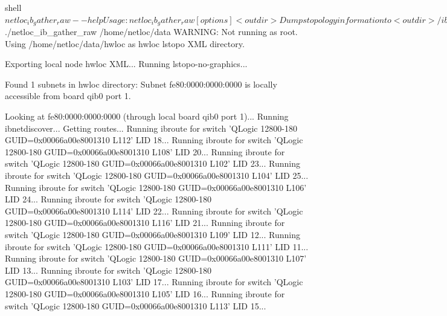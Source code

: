 \begin{DoxyVerb}shell$ netloc_ib_gather_raw --help
Usage: netloc_ib_gather_raw [options] <outdir>
  Dumps topology information to <outdir>/ib-raw/
  Subnets are guessed from the <outdir>/hwloc/ directory where
  the hwloc XML exports of some nodes are stored.
Options:
 --sudo
    Pass sudo to internal ibnetdiscover and ibroute invocations.
    Useful when the entire script cannot run as root.
 --hwloc-dir <dir>
    Use <dir> instead of <outdir>/hwloc/ for hwloc XML exports.
 --force-subnet [<subnet>:]<board>:<port> to force the discovery
    Do not guess subnets from hwloc XML exports.
    Force discovery on local board <board> port <port>
    and optionally force the subnet id <subnet>
    instead of reading it from the first GID.
    Examples: --force-subnet mlx4_0:1
              --force-subnet fe80:0000:0000:0000:mlx4_0:1
 --ibnetdiscover /path/to/ibnetdiscover
 --ibroute /path/to/ibroute
    Specify exact location of programs. Default is /usr/bin/<program>
 --sleep <n>
    Sleep for <n> seconds between invocations of programs probing the network
 --ignore-errors
    Ignore errors from ibnetdiscover and ibroute, assume their outputs are ok
 --force -f
    Always rediscover to overwrite existing files without asking
 --verbose -v
    Add verbose messages
 --dry-run
    Do not actually run programs or modify anything
 --help -h
    Show this help

shell$ ./netloc_ib_gather_raw /home/netloc/data
WARNING: Not running as root.
Using /home/netloc/data/hwloc as hwloc lstopo XML directory.

Exporting local node hwloc XML...
  Running lstopo-no-graphics...

Found 1 subnets in hwloc directory:
 Subnet fe80:0000:0000:0000 is locally accessible from board qib0 port 1.

Looking at fe80:0000:0000:0000 (through local board qib0 port 1)...
 Running ibnetdiscover...
 Getting routes...
  Running ibroute for switch 'QLogic 12800-180 GUID=0x00066a00e8001310 L112' LID 18...
  Running ibroute for switch 'QLogic 12800-180 GUID=0x00066a00e8001310 L108' LID 20...
  Running ibroute for switch 'QLogic 12800-180 GUID=0x00066a00e8001310 L102' LID 23...
  Running ibroute for switch 'QLogic 12800-180 GUID=0x00066a00e8001310 L104' LID 25...
  Running ibroute for switch 'QLogic 12800-180 GUID=0x00066a00e8001310 L106' LID 24...
  Running ibroute for switch 'QLogic 12800-180 GUID=0x00066a00e8001310 L114' LID 22...
  Running ibroute for switch 'QLogic 12800-180 GUID=0x00066a00e8001310 L116' LID 21...
  Running ibroute for switch 'QLogic 12800-180 GUID=0x00066a00e8001310 L109' LID 12...
  Running ibroute for switch 'QLogic 12800-180 GUID=0x00066a00e8001310 L111' LID 11...
  Running ibroute for switch 'QLogic 12800-180 GUID=0x00066a00e8001310 L107' LID 13...
  Running ibroute for switch 'QLogic 12800-180 GUID=0x00066a00e8001310 L103' LID 17...
  Running ibroute for switch 'QLogic 12800-180 GUID=0x00066a00e8001310 L105' LID 16...
  Running ibroute for switch 'QLogic 12800-180 GUID=0x00066a00e8001310 L113' LID 15...
\end{DoxyVerb}



